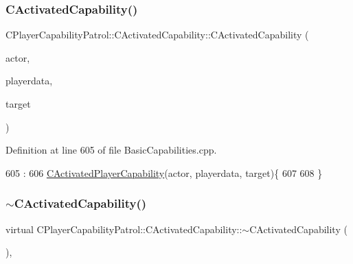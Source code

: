 \subsubsection{\texorpdfstring{C\+Activated\+Capability()}{CActivatedCapability()}}
{\footnotesize\ttfamily C\+Player\+Capability\+Patrol\+::\+C\+Activated\+Capability\+::\+C\+Activated\+Capability (\begin{DoxyParamCaption}\item[{std\+::shared\+\_\+ptr$<$ \hyperlink{classCPlayerAsset}{C\+Player\+Asset} $>$}]{actor,  }\item[{std\+::shared\+\_\+ptr$<$ \hyperlink{classCPlayerData}{C\+Player\+Data} $>$}]{playerdata,  }\item[{std\+::shared\+\_\+ptr$<$ \hyperlink{classCPlayerAsset}{C\+Player\+Asset} $>$}]{target }\end{DoxyParamCaption})}



Definition at line 605 of file Basic\+Capabilities.\+cpp.


\begin{DoxyCode}
605                                                                                                            
                                                                               :
606 \hyperlink{classCActivatedPlayerCapability_a1ece00ffb6a7b925c84dd94a7407a0d1}{CActivatedPlayerCapability}(actor, playerdata, target)\{
607 
608 \}
\end{DoxyCode}
\hypertarget{classCPlayerCapabilityPatrol_1_1CActivatedCapability_a2ad25677321b38e90d4e94abb0401aab}{}\label{classCPlayerCapabilityPatrol_1_1CActivatedCapability_a2ad25677321b38e90d4e94abb0401aab} 
\subsubsection{\texorpdfstring{$\sim$\+C\+Activated\+Capability()}{~CActivatedCapability()}}
{\footnotesize\ttfamily virtual C\+Player\+Capability\+Patrol\+::\+C\+Activated\+Capability\+::$\sim$\+C\+Activated\+Capability (\begin{DoxyParamCaption}{ }\end{DoxyParamCaption})\hspace{0.3cm}{\ttfamily [inline]}, {\ttfamily [virtual]}}



